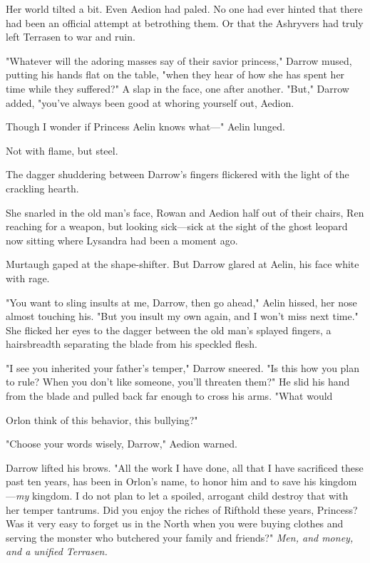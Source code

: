 Her world tilted a bit. Even Aedion had paled. No one had ever hinted that there had been an official attempt at betrothing them. Or that the Ashryvers had truly left Terrasen to war and ruin.

"Whatever will the adoring masses say of their savior princess," Darrow mused, putting his hands flat on the table, "when they hear of how she has spent her time while they suffered?" A slap in the face, one after another. "But," Darrow added, "you've always been good at whoring yourself out, Aedion.

Though I wonder if Princess Aelin knows what---" Aelin lunged.

Not with flame, but steel.

The dagger shuddering between Darrow's fingers flickered with the light of the crackling hearth.

She snarled in the old man's face, Rowan and Aedion half out of their chairs, Ren reaching for a weapon, but looking sick---sick at the sight of the ghost leopard now sitting where Lysandra had been a moment ago.

Murtaugh gaped at the shape-shifter. But Darrow glared at Aelin, his face white with rage.

"You want to sling insults at me, Darrow, then go ahead," Aelin hissed, her nose almost touching his. "But you insult my own again, and I won't miss next time." She flicked her eyes to the dagger between the old man's splayed fingers, a hairsbreadth separating the blade from his speckled flesh.

"I see you inherited your father's temper," Darrow sneered. "Is this how you plan to rule? When you don't like someone, you'll threaten them?" He slid his hand from the blade and pulled back far enough to cross his arms. "What would

Orlon think of this behavior, this bullying?"

"Choose your words wisely, Darrow," Aedion warned.

Darrow lifted his brows. "All the work I have done, all that I have sacrificed these past ten years, has been in Orlon's name, to honor him and to save his kingdom---\emph{my} kingdom. I do not plan to let a spoiled, arrogant child destroy that with her temper tantrums. Did you enjoy the riches of Rifthold these years, Princess? Was it very easy to forget us in the North when you were buying clothes and serving the monster who butchered your family and friends?" \emph{Men, and money, and a unified Terrasen.}


